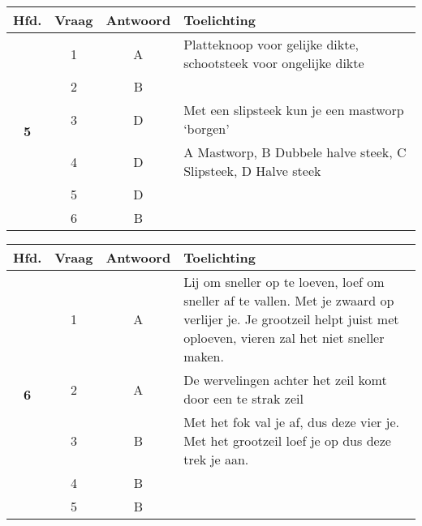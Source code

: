 \begin{table}[h]
	\centering
	\begin{tabular}{c|c|c|m{9.5cm}}
		\textbf{Hfd.}       & \textbf{Vraag} & \textbf{Antwoord} & \textbf{Toelichting} \\ \hline 
		\multirow{7}{*}{\sffamily\bfseries{\textcolor{ocre}{\LARGE5}} } & 1 & A & Platteknoop voor gelijke dikte, schootsteek voor ongelijke dikte \\ \cline{2-4} 
		& 2 & B &  \\ \cline{2-4} 
		& 3 & D & Met een slipsteek kun je een mastworp `borgen' \\ \cline{2-4} 
		& 4 & D & A Mastworp, B Dubbele halve steek, C Slipsteek, D Halve steek\\ \cline{2-4} 
		& 5 & D &  \\ \cline{2-4} 
		& 6 & B &  \\ 
	\end{tabular}
\end{table}


\begin{table}[h]
	\centering
	\begin{tabular}{c|c|c|m{9.5cm}}
		\textbf{Hfd.}       & \textbf{Vraag} & \textbf{Antwoord} & \textbf{Toelichting} \\ \hline 
		\multirow{6}{*}{\sffamily\bfseries{\textcolor{ocre}{\LARGE6}} }  & 1 & A & Lij om sneller op te loeven, loef om sneller af te vallen. Met je zwaard op verlijer je. Je grootzeil helpt juist met oploeven, vieren zal het niet sneller maken.  \\ \cline{2-4} 
		& 2 & A & De wervelingen achter het zeil komt door een te strak zeil \\ \cline{2-4} 
		& 3 & B & Met het fok val je af, dus deze vier je. Met het grootzeil loef je op dus deze trek je aan.  \\ \cline{2-4} 
		& 4 & B &  \\ \cline{2-4} 
		& 5 & B & 
	\end{tabular}
\end{table}

